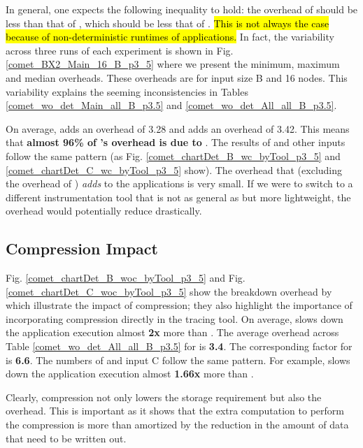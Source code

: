 In general, one 
expects the following inequality to hold:
 the overhead of \pininit should be less than that of \parlot
, which should be less that of \parlotnc. 
%
\hl{This is not always the case because of non-deterministic runtimes of applications.}
%
In fact, the variability across three runs of each experiment
is shown in Fig. \ref{comet_BX2_Main_16_B_p3_5}
where we present the minimum, maximum and median overheads.
%
These
overheads are for input size B and 16 nodes. 
%
This variability explains the seeming inconsistencies in  Tables
\ref{comet_wo_det_Main_all_B_p3.5} and
\ref{comet_wo_det_All_all_B_p3.5}.


On average, \pininit adds
an overhead of 3.28  and \parlota adds an overhead of 3.42. 
%
This means that \textbf{almost 96\%
of \parlota's overhead is due to \pin}. 
%
The results of \parlotm and
other inputs follow the same pattern
(as Fig. \ref{comet_chartDet_B_wc_byTool_p3_5} and \ref{comet_chartDet_C_wc_byTool_p3_5} show). 
%
The overhead that \parlot (excluding the overhead of \pininit) {\em adds}
to the applications is very small.
%
If we were to switch to a different
instrumentation tool that is not as general as \pin but more
lightweight, the overhead would potentially reduce drastically. \\


\subsection{Compression Impact} 
\label{subsec:compact}

Fig. \ref{comet_chartDet_B_woc_byTool_p3_5} and Fig. \ref{comet_chartDet_C_woc_byTool_p3_5} show the breakdown overhead by \parlotnc which illustrate the impact of compression; they also highlight the importance of incorporating compression directly in the tracing tool. 
%
On average, \parlotnc slows down the application execution almost \textbf{2x} more than \parlota. 
%
The average overhead 
across Table \ref{comet_wo_det_All_all_B_p3.5} for \parlota is \textbf{3.4}.
%
The  corresponding factor for \parlotnc is \textbf{6.6}. 
%
The numbers of \parlotm and input C  follow the same pattern. For example, \parlotnc slows down the application execution almost \textbf{1.66x} more than \parlotm.
%

Clearly, compression not only lowers the storage requirement but also the overhead. This is important as it shows that the extra computation to perform the compression is more than amortized by the reduction in the amount of data that need to be written out.





